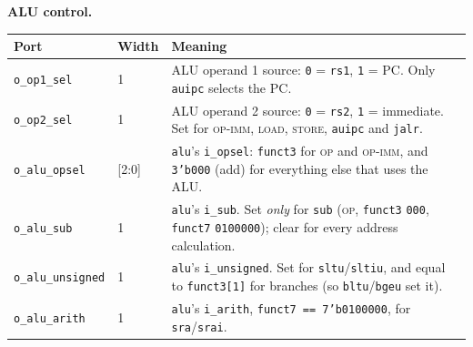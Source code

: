 \documentclass[11pt]{article}
\begin{document}
\noindent\begin{minipage}{\linewidth}
\textbf{ALU control.}

\smallskip

\begin{center}
\begin{tabular}{@{}llp{12.0cm}@{}}
\toprule
\textbf{Port} & \textbf{Width} & \textbf{Meaning} \\
\midrule
\texttt{o\_op1\_sel}     & 1     & ALU operand 1 source: \texttt{0} = \texttt{rs1}, \texttt{1} = PC. Only \texttt{auipc} selects the PC. \\
\texttt{o\_op2\_sel}     & 1     & ALU operand 2 source: \texttt{0} = \texttt{rs2}, \texttt{1} = immediate. Set for \textsc{op-imm}, \textsc{load}, \textsc{store}, \texttt{auipc} and \texttt{jalr}. \\
\texttt{o\_alu\_opsel}   & [2:0] & \texttt{alu}'s \texttt{i\_opsel}: \texttt{funct3} for \textsc{op} and \textsc{op-imm}, and \texttt{3'b000} (add) for everything else that uses the ALU. \\
\texttt{o\_alu\_sub}     & 1     & \texttt{alu}'s \texttt{i\_sub}. Set \emph{only} for \texttt{sub} (\textsc{op}, \texttt{funct3} \texttt{000}, \texttt{funct7} \texttt{0100000}); clear for every address calculation. \\
\texttt{o\_alu\_unsigned}& 1     & \texttt{alu}'s \texttt{i\_unsigned}. Set for \texttt{sltu}/\texttt{sltiu}, and equal to \texttt{funct3[1]} for branches (so \texttt{bltu}/\texttt{bgeu} set it). \\
\texttt{o\_alu\_arith}   & 1     & \texttt{alu}'s \texttt{i\_arith}, \texttt{funct7 == 7'b0100000}, for \texttt{sra}/\texttt{srai}. \\
\bottomrule
\end{tabular}
\end{center}
\end{minipage}
\par\medskip
\end{document}
